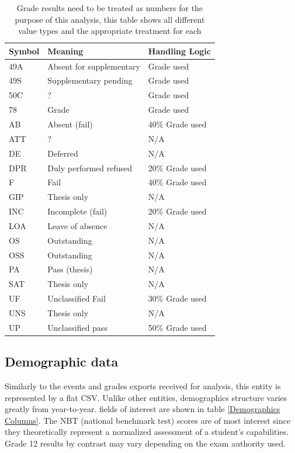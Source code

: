\begin{table}[]
  \centering
  \caption{Grade results need to be treated as numbers for the purpose of this analysis, this table shows all different value types and the appropriate treatment for each}
  \label{PercentTreatment}
  \begin{tabular}{lll}
    Symbol & Meaning                  & Handling Logic  \\ \hline
    49A    & Absent for supplementary & Grade used      \\
    49S    & Supplementary pending    & Grade used      \\
    50C    & ?                        & Grade used      \\
    78     & Grade                    & Grade used      \\
    AB     & Absent (fail)            & 40\% Grade used \\
    ATT    & ?                        & N/A             \\
    DE     & Deferred                 & N/A             \\
    DPR    & Duly performed refused   & 20\% Grade used \\
    F      & Fail                     & 40\% Grade used \\
    GIP    & Thesis only              & N/A             \\
    INC    & Incomplete (fail)        & 20\% Grade used \\
    LOA    & Leave of absence         & N/A             \\
    OS     & Outstanding              & N/A             \\
    OSS    & Outstanding              & N/A             \\
    PA     & Pass (thesis)            & N/A             \\
    SAT    & Thesis only              & N/A             \\
    UF     & Unclassified Fail        & 30\% Grade used \\
    UNS    & Thesis only              & N/A             \\
    UP     & Unclassified pass        & 50\% Grade used \\ \hline
  \end{tabular}
\end{table}

\subsection{Demographic data}
Similarly to the events and grades exports received for analysis, this entity is represented by a flat CSV. Unlike other entities, demographics structure varies greatly from year-to-year. fields of interest are shown in table \ref{Demographics Columns}. The NBT (national benchmark test) scores are of most interest since they theoretically represent a normalized assessment of a student's capabilities. Grade 12 results by contrast may vary depending on the exam authority used.

